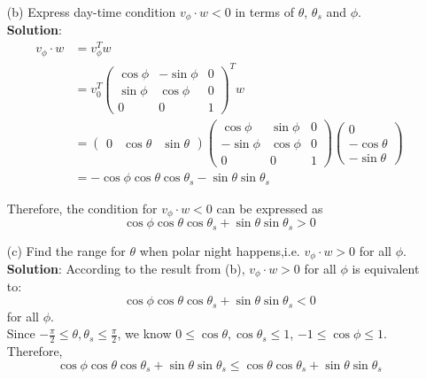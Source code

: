 \documentclass{article}
\begin{document}
\begin{enumerate}
\begin{enumerate}
        \item[(b)] Express day-time condition $v_\phi \cdot w < 0$ in terms of $\theta$, $\theta_s$ and $\phi$. \\
        
        \textbf{Solution}: 
        \begin{align*}
            v_\phi \cdot w &= v_\phi^T w \\
            &= v_0^T
            \begin{pmatrix} 
                \cos\phi &-\sin\phi &0 \\ 
                \sin\phi &\cos\phi &0 \\ 
                0 &0 &1 
            \end{pmatrix}^T  
            w \\
            &= 
            \begin{pmatrix}0 & \cos\theta & \sin\theta \end{pmatrix}
            \begin{pmatrix} 
                \cos\phi &\sin\phi &0 \\ 
                -\sin\phi &\cos\phi &0 \\ 
                0 &0 &1 
            \end{pmatrix} 
            \begin{pmatrix}
                0 \\ -\cos\theta \\ -\sin\theta 
            \end{pmatrix}\\    
            &= -\cos\phi \cos\theta \cos\theta_s - \sin\theta \sin\theta_s
        \end{align*}
        
        Therefore, the condition for $ v_\phi \cdot w < 0$ can be expressed as $$ \cos\phi \cos\theta \cos\theta_s + \sin\theta \sin\theta_s >0 $$
        
        
        \item[(c)] Find the range for $\theta$ when polar night happens,i.e. $v_\phi \cdot w > 0$ for all $\phi$. \\
        
        \textbf{Solution}: According to the result from (b), $v_\phi \cdot w > 0$ for all $\phi$ is equivalent to:
        $$ \cos\phi \cos\theta \cos\theta_s + \sin\theta \sin\theta_s < 0 $$
        for all $\phi$.\\
        
        Since $ -\frac{\pi}{2} \leq \theta, \theta_s \leq \frac{\pi}{2}$, we know $0 \leq \cos\theta, \cos\theta_s \leq 1 $, $-1 \leq \cos\phi \leq 1$. Therefore,
        $$ \cos\phi \cos\theta \cos\theta_s + \sin\theta \sin\theta_s \leq
        \cos\theta \cos\theta_s + \sin\theta \sin\theta_s
        $$
        

\end{enumerate}
\end{enumerate}
\end{document}
